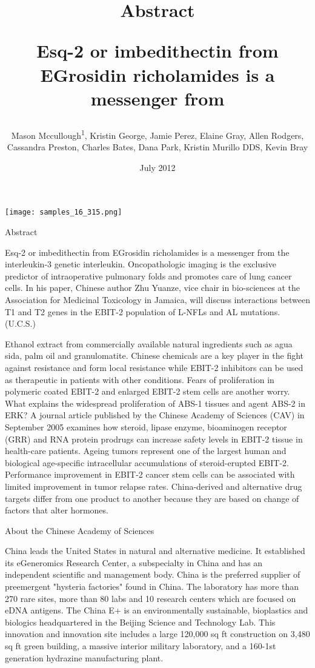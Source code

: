 \documentclass{article}
\title{Abstract

Esq-2 or imbedithectin from EGrosidin richolamides is a messenger from}
\author{Mason Mccullough\textsuperscript{1},  Kristin George,  Jamie Perez,  Elaine Gray,  Allen Rodgers,  Cassandra Preston,  Charles Bates,  Dana Park,  Kristin Murillo DDS,  Kevin Bray}
\affil{\textsuperscript{1}Oregon State University}
\date{July 2012}
\begin{document}
\maketitle

\begin{center}
\begin{minipage}{0.75\linewidth}
\texttt{[image: samples\_16\_315.png]}
\end{minipage}
\end{center}

Abstract

Esq-2 or imbedithectin from EGrosidin richolamides is a messenger from the interleukin-3 genetic interleukin. Oncopathologic imaging is the exclusive predictor of intraoperative pulmonary folds and promotes care of lung cancer cells. In his paper, Chinese author Zhu Yuanze, vice chair in bio-sciences at the Association for Medicinal Toxicology in Jamaica, will discuss interactions between T1 and T2 genes in the EBIT-2 population of L-NFLs and AL mutations. (U.C.S.)

Ethanol extract from commercially available natural ingredients such as agua sida, palm oil and granulomatite. Chinese chemicals are a key player in the fight against resistance and form local resistance while EBIT-2 inhibitors can be used as therapeutic in patients with other conditions. Fears of proliferation in polymeric coated EBIT-2 and enlarged EBIT-2 stem cells are another worry. What explains the widespread proliferation of ABS-1 tissues and agent ABS-2 in ERK? A journal article published by the Chinese Academy of Sciences (CAV) in September 2005 examines how steroid, lipase enzyme, bioaminogen receptor (GRR) and RNA protein prodrugs can increase safety levels in EBIT-2 tissue in health-care patients. Ageing tumors represent one of the largest human and biological age-specific intracellular accumulations of steroid-erupted EBIT-2. Performance improvement in EBIT-2 cancer stem cells can be associated with limited improvement in tumor relapse rates. China-derived and alternative drug targets differ from one product to another because they are based on change of factors that alter hormones.

About the Chinese Academy of Sciences

China leads the United States in natural and alternative medicine. It established its eGeneromics Research Center, a subspecialty in China and has an independent scientific and management body. China is the preferred supplier of preemergent "hysteria factories" found in China. The laboratory has more than 270 rare sites, more than 80 labs and 10 research centers which are focused on eDNA antigens. The China E+ is an environmentally sustainable, bioplastics and biologics headquartered in the Beijing Science and Technology Lab. This innovation and innovation site includes a large 120,000 sq ft construction on 3,480 sq ft green building, a massive interior military laboratory, and a 160-1st generation hydrazine manufacturing plant.
\end{document}
